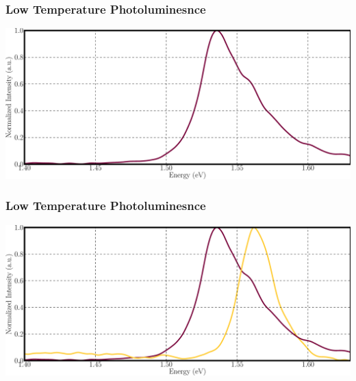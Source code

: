 \documentclass[]{beamer}%
\begin{document}
\begin{frame}
    \frametitle{Low Temperature Photoluminesnce}
    \begin{center}
        \includegraphics[width=\textwidth]{graphics/cdteliftoff_PL_attached}
    \end{center}
\end{frame}

\begin{frame}
        \frametitle{Low Temperature Photoluminesnce}
    \begin{center}
        \includegraphics[width=\textwidth]{graphics/cdteliftoff_PL_joined}
    \end{center}
\end{frame}
\end{document}
